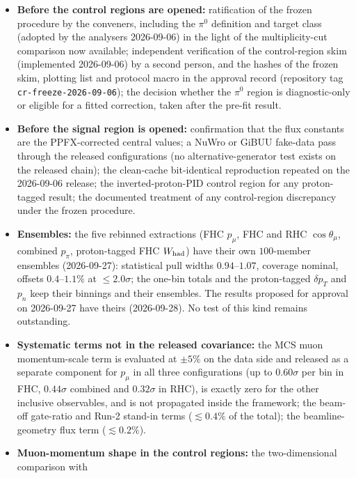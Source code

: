 \begin{itemize}\itemsep2pt
  \item \textbf{Before the control regions are opened:} ratification of the frozen
    procedure by the conveners, including the $\pi^0$ definition and target class
    (adopted by the analysers 2026-09-06) in the light of the multiplicity-cut comparison
    now available; independent verification of the
    control-region skim (implemented 2026-09-06) by a second person, and the hashes of
    the frozen skim, plotting list and protocol macro in the approval record (repository
    tag \texttt{cr-freeze-2026-09-06}); the decision whether the $\pi^0$ region is
    diagnostic-only or eligible for a fitted correction, taken after the pre-fit result.
  \item \textbf{Before the signal region is opened:} confirmation that the flux constants
    are the PPFX-corrected central values; a NuWro or GiBUU fake-data pass through the
    released configurations (no alternative-generator test exists on the released chain);
    the clean-cache bit-identical reproduction repeated on the 2026-09-06 release; the inverted-proton-PID
    control region for any proton-tagged result; the documented treatment of any
    control-region discrepancy under the frozen procedure.
  \item \textbf{Ensembles:} the five rebinned extractions (FHC $p_\mu$, FHC and RHC
    $\cos\theta_\mu$, combined $p_\pi$, proton-tagged FHC $W_{\rm had}$) have their own $100$-member
    ensembles (2026-09-27): statistical pull widths $0.94$--$1.07$, coverage nominal, offsets
    $0.4$--$1.1\%$ at $\le2.0\sigma$; the one-bin totals and the proton-tagged $\delta p_T$ and $p_n$
    keep their binnings and their ensembles. The results proposed for approval on 2026-09-27 have
    theirs (2026-09-28). No test of this kind remains outstanding.
  \item \textbf{Systematic terms not in the released covariance:} the MCS muon momentum-scale
    term is evaluated at $\pm5\%$ on the data side and released as a separate component for $p_\mu$
    in all three configurations (up to $0.60\sigma$ per bin in FHC, $0.44\sigma$ combined and
    $0.32\sigma$ in RHC), is exactly zero for the other inclusive observables, and is not propagated
    inside the framework; the beam-off gate-ratio and Run-2 stand-in terms ($\lesssim0.4\%$
    of the total); the beamline-geometry flux term ($\lesssim0.2\%$).
  \item \textbf{Muon-momentum shape in the control regions:} the two-dimensional comparison with

\end{itemize}
